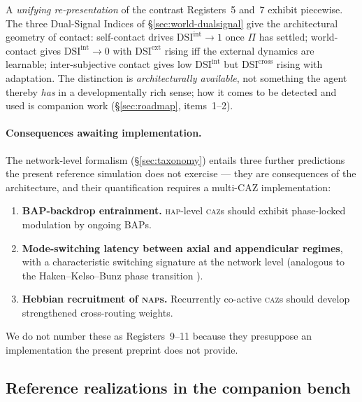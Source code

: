 \documentclass{article}
\newcommand{\caz}{\textsc{caz}}
\newcommand{\hap}{\textsc{hap}}
\newcommand{\nap}{\textsc{nap}}
\begin{document}
\begin{description}[itemsep=4pt,labelindent=0pt,leftmargin=2em,
                    style=nextline]
\item[Register 8 (the dual-signal contrast: self / world / other):]
A \emph{unifying re-presentation} of the contrast Registers~5 and~7
exhibit piecewise.  The three Dual-Signal Indices of
\S\ref{sec:world-dualsignal} give the architectural geometry of contact:
self-contact drives $\mathrm{DSI}^{\mathrm{int}}\to 1$ once $\Pi$ has
settled; world-contact gives $\mathrm{DSI}^{\mathrm{int}}\to 0$ with
$\mathrm{DSI}^{\mathrm{ext}}$ rising iff the external dynamics are
learnable; inter-subjective contact gives low
$\mathrm{DSI}^{\mathrm{int}}$ but $\mathrm{DSI}^{\mathrm{cross}}$ rising
with adaptation.  The distinction is \emph{architecturally available}, not
something the agent thereby \emph{has} in a developmentally rich sense;
how it comes to be detected and used is companion work
(\S\ref{sec:roadmap}, items~1--2).
\end{description}

\paragraph{Consequences awaiting implementation.}
The network-level formalism (\S\ref{sec:taxonomy}) entails three further
predictions the present reference simulation does not exercise --- they
are consequences of the architecture, and their quantification requires a
multi-CAZ implementation:
\begin{enumerate}[leftmargin=2em,itemsep=2pt]
\item \textbf{BAP-backdrop entrainment.} \hap-level \caz{}s should exhibit
phase-locked modulation by ongoing BAPs.
\item \textbf{Mode-switching latency between axial and appendicular
regimes}, with a characteristic switching signature at the network level
(analogous to the Haken--Kelso--Bunz phase transition
\citep{HakenKelsoBunz1985PhaseTransitions}).
\item \textbf{Hebbian recruitment of \nap{}s.} Recurrently co-active
\caz{}s should develop strengthened cross-routing weights.
\end{enumerate}
We do not number these as Registers~9--11 because they presuppose an
implementation the present preprint does not provide.

\subsection{Reference realizations in the companion bench}\label{app:simulations}
\end{document}
